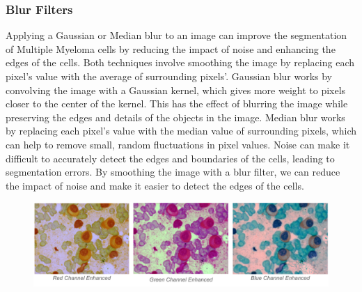 \documentclass{article}
\begin{document}
\subsubsection{Blur Filters}

Applying a Gaussian or Median blur to an image can improve the segmentation of Multiple Myeloma cells by reducing the impact of noise and enhancing the edges of the cells. Both techniques involve smoothing the image by replacing each pixel's value with the average of surrounding pixels'. Gaussian blur works by convolving the image with a Gaussian kernel, which gives more weight to pixels closer to the center of the kernel. This has the effect of blurring the image while preserving the edges and details of the objects in the image. Median blur works by replacing each pixel's value with the median value of surrounding pixels, which can help to remove small, random fluctuations in pixel values. Noise can make it difficult to accurately detect the edges and boundaries of the cells, leading to segmentation errors. By smoothing the image with a blur filter, we can reduce the impact of noise and make it easier to detect the edges of the cells.

\begin{figure}
  \centering
  \begin{minipage}{1\textwidth}
    \centering
    \includegraphics[width=0.8\linewidth]{7.png}
  \end{minipage}%
\end{figure}
\end{document}

